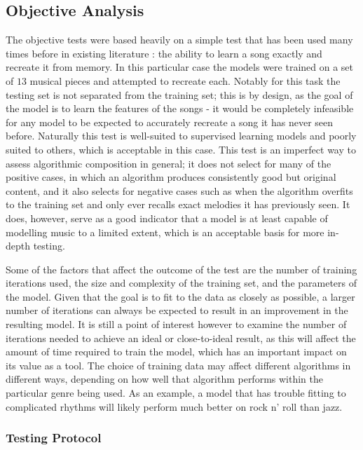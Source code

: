 \documentclass[ author={Stephen Livermore-Tozer},
				supervisor={Dr. Peter Flach},
				degree={MEng},
				title={Algorithmic Co-composition Using Machine Learning},
				subtitle={},
				type={research},
				year={2016} ]{dissertation}
\begin{document}
	\subsection{Objective Analysis}
	\label{sec:objective-analysis}
	
	The objective tests were based heavily on a simple test that has been used many times before in existing literature \cite{todd1989connectionist,franklin2006recurrent,paiement2007generative}: the ability to learn a song exactly and recreate it from memory. In this particular case the models were trained on a set of $13$ musical pieces and attempted to recreate each. Notably for this task the testing set is not separated from the training set; this is by design, as the goal of the model is to learn the features of the songs - it would be completely infeasible for any model to be expected to accurately recreate a song it has never seen before. Naturally this test is well-suited to supervised learning models and poorly suited to others, which is acceptable in this case. This test is an imperfect way to assess algorithmic composition in general; it does not select for many of the positive cases, in which an algorithm produces consistently good but original content, and it also selects for negative cases such as when the algorithm overfits to the training set and only ever recalls exact melodies it has previously seen. It does, however, serve as a good indicator that a model is at least capable of modelling music to a limited extent, which is an acceptable basis for more in-depth testing.
	
	Some of the factors that affect the outcome of the test are the number of training iterations used, the size and complexity of the training set, and the parameters of the model. Given that the goal is to fit to the data as closely as possible, a larger number of iterations can always be expected to result in an improvement in the resulting model. It is still a point of interest however to examine the number of iterations needed to achieve an ideal or close-to-ideal result, as this will affect the amount of time required to train the model, which has an important impact on its value as a tool. The choice of training data may affect different algorithms in different ways, depending on how well that algorithm performs within the particular genre being used. As an example, a model that has trouble fitting to complicated rhythms will likely perform much better on rock n' roll than jazz. 
	
	\subsubsection{Testing Protocol}
	
\end{document}
